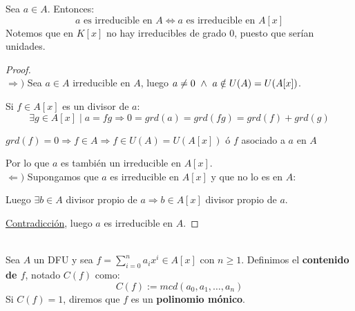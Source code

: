 \begin{prop}
    Sea $a \in A$. Entonces:
    $$a \mbox{ es irreducible en } A \Leftrightarrow a \mbox{ es irreducible en } A[x]$$
    Notemos que en $K[x]$ no hay irreducibles de grado 0, puesto que serían unidades.
\begin{proof}
    \ \\
    $\Longrightarrow)$ Sea $a \in A$ irreducible en $A$, luego $a \neq 0 \ \land \  a \notin U(A) = U(A[x])$.\par
    Si $f \in A[x]$ es un divisor de $a$:
    $$\exists g \in A[x] \mid a=fg \Rightarrow 0 = grd(a) = grd(fg) = grd(f) + grd(g)$$

    $ grd(f) = 0 \Rightarrow f \in A \Rightarrow f \in U(A) = U(A[x])$ ó $f$ asociado a $a$ en $A$\par
    Por lo que $a$ es también un irreducible en $A[x]$.\\

    
    $\Longleftarrow)$ Supongamos que $a$ es irreducible en $A[x]$ y que no lo es en $A$:\par
    Luego $\exists b \in A$ divisor propio de $a \Rightarrow b \in A[x]$ divisor propio de $a$. \par
    \underline{Contradicción}, luego $a$ es irreducible en $A$.
\end{proof}
\end{prop}

\begin{definicion}
    \ \\
    Sea $A$ un DFU y sea $\displaystyle f=\sum_{i=0}^n a_i x^i \in A[x]$ con $n \geq 1$. Definimos el \textbf{contenido
        de $f$}, notado $C(f)$ como:
    $$C(f):=mcd(a_0,a_1, \ldots, a_n)$$
    Si $C(f)=1$, diremos que $f$ es un \textbf{polinomio mónico}.
\end{definicion}

